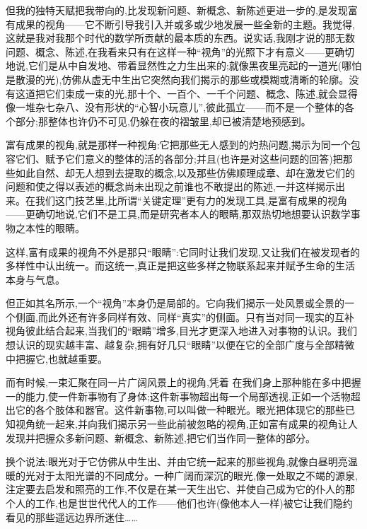 但我的独特天赋把我带向的,比发现新问题、新概念、新陈述更进一步的,是发现富有成果的视角——它不断引导我引入并或多或少地发展一些全新的主题。我觉得,这就是我对我那个时代的数学所贡献的最本质的东西。说实话,我刚才说的那无数问题、概念、陈述,在我看来只有在这样一种“视角”的光照下才有意义——更确切地说,它们是从中自发地、带着显然性之力生出来的;就像黑夜里亮起的一道光(哪怕是散漫的光),仿佛从虚无中生出它突然向我们揭示的那些或模糊或清晰的轮廓。没有这道把它们束成一束的光,那十个、一百个、一千个问题、概念、陈述,就会显得像一堆杂七杂八、没有形状的“心智小玩意儿”,彼此孤立——而不是一个整体的各个部分;那整体也许仍不可见,仍躲在夜的褶皱里,却已被清楚地预感到。

富有成果的视角,就是那样一种视角:它把那些无人感到的灼热问题,揭示为同一个包容它们、赋予它们意义的整体的活的各部分;并且(也许是对这些问题的回答)把那些如此自然、却无人想到去提取的概念,以及那些仿佛顺理成章、却在激发它们的问题和使之得以表述的概念尚未出现之前谁也不敢提出的陈述,一并这样揭示出来。在我们这门技艺里,比所谓“关键定理”更有力的发现工具,是富有成果的视角——更确切地说,它们不是工具,而是研究者本人的眼睛,那双热切地想要认识数学事物之本性的眼睛。

这样,富有成果的视角不外是那只“眼睛”:它同时让我们发现,又让我们在被发现者的多样性中认出统一。而这统一,真正是把这些多样之物联系起来并赋予生命的生活本身与气息。

但正如其名所示,一个“视角”本身仍是局部的。它向我们揭示一处风景或全景的一个侧面,而此外还有许多同样有效、同样“真实”的侧面。只有当对同一现实的互补视角彼此结合起来,当我们的“眼睛”增多,目光才更深入地进入对事物的认识。我们想认识的现实越丰富、越复杂,拥有好几只“眼睛”以便在它的全部广度与全部精微中把握它,也就越重要。

而有时候,一束汇聚在同一片广阔风景上的视角,凭着
在我们身上那种能在多中把握一的能力,使一件新事物有了身体;这件新事物超出每一个局部透视,正如一个活物超出它的各个肢体和器官。这件新事物,可以叫做一种眼光。眼光把体现它的那些已知视角统一起来,并向我们揭示另一些此前被忽略的视角,正如富有成果的视角让人发现并把握众多新问题、新概念、新陈述,把它们当作同一整体的部分。

换个说法:眼光对于它仿佛从中生出、并由它统一起来的那些视角,就像白昼明亮温暖的光对于太阳光谱的不同成分。一种广阔而深沉的眼光,像一处取之不竭的源泉,注定要去启发和照亮的工作,不仅是在某一天生出它、并使自己成为它的仆人的那个人的工作,也是世世代代人的工作——他们也许(像他本人一样)被它让我们隐约看见的那些遥远边界所迷住……

